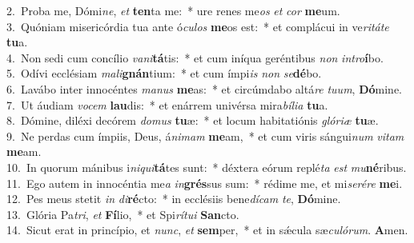 {2.~}Proba me, Dómi\textit{ne}, \textit{et} \textbf{ten}ta me:~* ure renes me\textit{os} \textit{et} \textit{cor} \textbf{me}um.\\
{3.~}Quóniam misericórdia tua ante ó\textit{cu}\textit{los} \textbf{me}os est:~* et complácui in ve\textit{ri}\textit{tá}\textit{te} \textbf{tu}a.\\
{4.~}Non sedi cum concílio \textit{va}\textit{ni}\textbf{tá}tis:~* et cum iníqua geréntibus \textit{non} \textit{in}\textit{tro}\textbf{í}bo.\\
{5.~}Odívi ecclésiam \textit{ma}\textit{li}\textbf{gnán}tium:~* et cum ímpi\textit{is} \textit{non} \textit{se}\textbf{dé}bo.\\
{6.~}Lavábo inter innocéntes \textit{ma}\textit{nus} \textbf{me}as:~* et circúmdabo altá\textit{re} \textit{tu}\textit{um}, \textbf{Dó}mine.\\
{7.~}Ut áudiam \textit{vo}\textit{cem} \textbf{lau}dis:~* et enárrem univérsa mira\textit{bí}\textit{li}\textit{a} \textbf{tu}a.\\
{8.~}Dómine, diléxi decórem \textit{do}\textit{mus} \textbf{tu}æ:~* et locum habitatiónis \textit{gló}\textit{ri}\textit{æ} \textbf{tu}æ.\\
{9.~}Ne perdas cum ímpiis, Deus, á\textit{ni}\textit{mam} \textbf{me}am,~* et cum viris sángui\textit{num} \textit{vi}\textit{tam} \textbf{me}am.\\
{10.~}In quorum mánibus i\textit{ni}\textit{qui}\textbf{tá}tes sunt:~* déxtera eórum replé\textit{ta} \textit{est} \textit{mu}\textbf{né}ribus.\\
{11.~}Ego autem in innocéntia me\textit{a} \textit{in}\textbf{grés}sus sum:~* rédime me, et mi\textit{se}\textit{ré}\textit{re} \textbf{me}i.\\
{12.~}Pes meus stetit \textit{in} \textit{di}\textbf{ré}cto:~* in ecclésiis bene\textit{dí}\textit{cam} \textit{te}, \textbf{Dó}mine.\\
{13.~}Glória Pa\textit{tri}, \textit{et} \textbf{Fí}lio,~* et Spi\textit{rí}\textit{tu}\textit{i} \textbf{San}cto.\\
{14.~}Sicut erat in princípio, et \textit{nunc}, \textit{et} \textbf{sem}per,~* et in sǽcula sæ\textit{cu}\textit{ló}\textit{rum}. \textbf{A}men.\\
